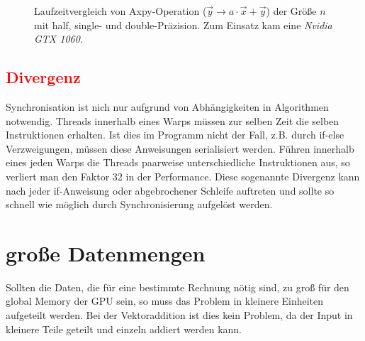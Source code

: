 		\begin{figure}[h]
  		\centering
  		\caption[Axpy mit verschiedenen Präzisionen]{Laufzeitvergleich von Axpy-Operation ($\vec{y}\rightarrow a\cdot\vec{x}+\vec{y}$) der Grö\ss e $n$ mit half, single- und double-Präzision. Zum Einsatz kam eine \textit{Nvidia GTX 1060}.}
  		\label{fig3:axpy}
		\end{figure}
		
		
		\subsection*{\textcolor{red}{Divergenz}}
		Synchronisation ist nich nur aufgrund von Abhängigkeiten in Algorithmen notwendig. \Glspl{Thread} innerhalb eines \Glspl{Warp} müssen zur selben Zeit die selben Instruktionen erhalten. Ist dies im Programm nicht der Fall, z.B. durch if-else Verzweigungen, müssen diese Anweisungen serialisiert werden. Führen innerhalb eines jeden \Glspl{Warp} die \Glspl{Thread} paarweise unterschiedliche Instruktionen aus, so verliert man den Faktor 32 in der \Gls{Performance}. Diese sogenannte Divergenz kann nach jeder if-Anweisung oder abgebrochener Schleife auftreten und sollte so schnell wie möglich durch Synchronisierung aufgelöst werden. 
		
		\section{gro\ss e Datenmengen}\label{data}
		Sollten die Daten, die für eine bestimmte Rechnung nötig sind, zu groß für den \Gls{global Memory} der GPU sein, so muss das Problem in kleinere Einheiten aufgeteilt werden. Bei der Vektoraddition ist dies kein Problem, da der Input in kleinere Teile geteilt und einzeln addiert werden kann. 
		
